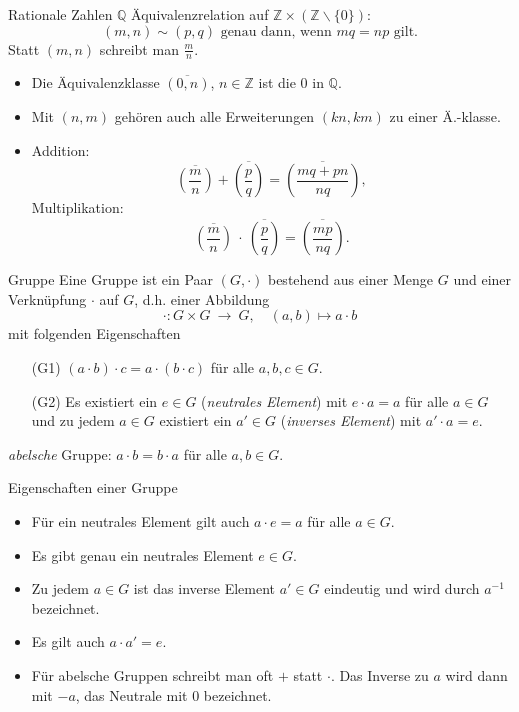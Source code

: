 \documentclass[notes=hide,hyperref={dvipdfmx,pdfpagelabels=false}]{beamer}
\begin{document}
\begin{frame}[fragile]{Rationale Zahlen $\mathbb{Q}$}
Äquivalenzrelation auf $\mathbb{Z}\times(\mathbb{Z}\smallsetminus \{ 0\})$:
\[ (m,n) \sim (p,q) \mbox{ genau dann, wenn } mq=np \mbox{ gilt.} \]
Statt $(m,n)$ schreibt man $\frac{m}{n}$.
\begin{itemize}
\item Die Äquivalenzklasse $\overline{(0,n)}$, $n \in \mathbb{Z}$ ist
die $0$ in $\mathbb{Q}$.
\item Mit $(n,m)$ gehören auch alle Erweiterungen $(kn,km)$ zu einer
Ä.-klasse.  
\item Addition:  
\[ 
\overline{\genfrac(){}{}{m}{n}}+\overline{\genfrac(){}{}{p}{q}}=\overline{\genfrac(){}{}{mq+pn}{nq}},
\]
Multiplikation:
\[
\overline{\genfrac(){}{}{m}{n}} \ \cdot \ \overline{\genfrac(){}{}{p}{q}}=\overline{\genfrac(){}{}{mp}{nq}}.
\]
\end{itemize} 
\end{frame}


\begin{frame}[fragile]{Gruppe}
Eine {\color{red} Gruppe} ist ein Paar $(G,\cdot)$ bestehend aus einer Menge
$G$ und einer Verknüpfung $\cdot$ auf $G$, d.h. einer Abbildung
\[
 \cdot: G \times G \ \rightarrow \ G, \quad (a,b) \mapsto a \cdot b
\]
mit folgenden Eigenschaften
\begin{itemize}
\item [(G1)] $(a \cdot b) \cdot c =a \cdot (b \cdot c)$ für alle
$a,b,c \in G$.
\item [(G2)] Es existiert ein $e \in G$ ({\it neutrales Element}) mit $e \cdot a =a$ für alle $a
\in G$ und zu jedem $a \in G$ existiert ein $a' \in G$ ({\it inverses
Element}) mit $a' \cdot
a=e$. 
\end{itemize}  
{\it abelsche} Gruppe: $a \cdot b = b \cdot a$ \alert{für alle} $a,b \in G$.
\end{frame}

\begin{frame}[fragile]{Eigenschaften einer Gruppe}
\begin{itemize}
\item Für ein neutrales Element gilt auch $a \cdot e= a$ für alle
$a\in G$.
\item Es gibt genau ein neutrales Element $e \in G$.
\item Zu jedem $a \in G$ ist das inverse Element $a' \in G$ eindeutig
und wird durch $a^{-1}$ bezeichnet. 
\item Es gilt auch $a \cdot a'=e$. 
\item Für abelsche Gruppen schreibt man oft $+$ statt $\cdot$. Das Inverse zu $a$ wird dann mit $-a$, das Neutrale mit $0$ bezeichnet.
\end{itemize}
\end{frame}
\end{document}
